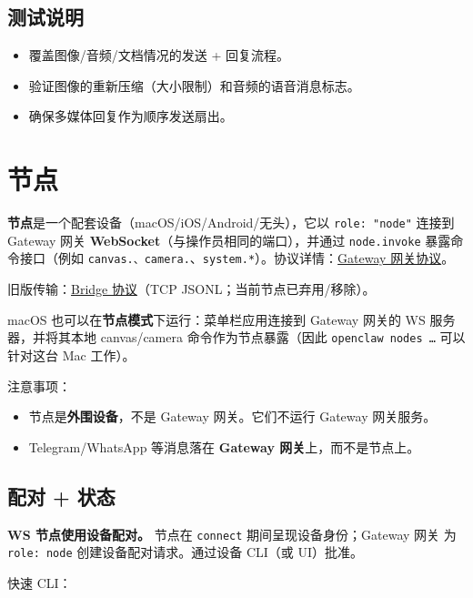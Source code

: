 \subsection{测试说明}


\begin{itemize}
  \item 覆盖图像/音频/文档情况的发送 + 回复流程。
  \item 验证图像的重新压缩（大小限制）和音频的语音消息标志。
  \item 确保多媒体回复作为顺序发送扇出。
\end{itemize}



\clearpage

\section{节点}


\textbf{节点}是一个配套设备（macOS/iOS/Android/无头），它以 \texttt{role: "node"} 连接到 Gateway 网关 \textbf{WebSocket}（与操作员相同的端口），并通过 \texttt{node.invoke} 暴露命令接口（例如 \texttt{canvas.\textit{}、\texttt{camera.}}、\texttt{system.*}）。协议详情：\href{/gateway/protocol}{Gateway 网关协议}。

旧版传输：\href{/gateway/bridge-protocol}{Bridge 协议}（TCP JSONL；当前节点已弃用/移除）。

macOS 也可以在\textbf{节点模式}下运行：菜单栏应用连接到 Gateway 网关的 WS 服务器，并将其本地 canvas/camera 命令作为节点暴露（因此 \texttt{openclaw nodes …} 可以针对这台 Mac 工作）。

注意事项：

\begin{itemize}
  \item 节点是\textbf{外围设备}，不是 Gateway 网关。它们不运行 Gateway 网关服务。
  \item Telegram/WhatsApp 等消息落在 \textbf{Gateway 网关}上，而不是节点上。
\end{itemize}


\subsection{配对 + 状态}


\textbf{WS 节点使用设备配对。} 节点在 \texttt{connect} 期间呈现设备身份；Gateway 网关
为 \texttt{role: node} 创建设备配对请求。通过设备 CLI（或 UI）批准。

快速 CLI：


